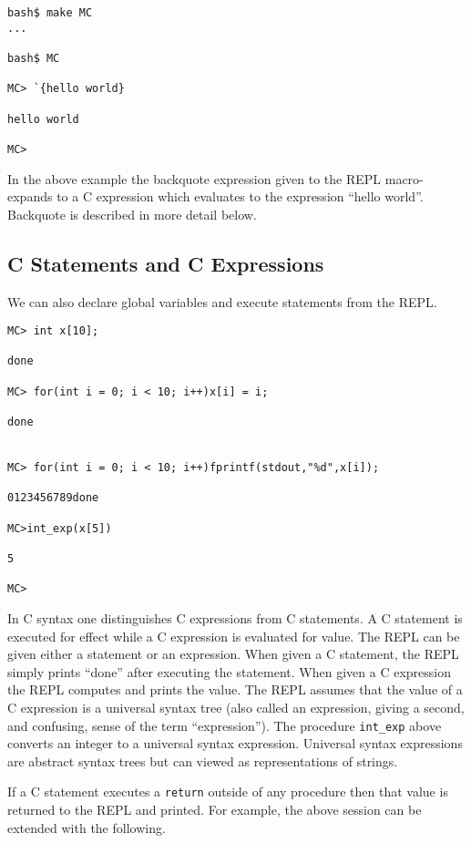 \documentclass{article}
\begin{document}
\begin{verbatim}
bash$ make MC
...

bash$ MC

MC> `{hello world}

hello world

MC>
\end{verbatim}

In the above example the backquote expression given to the REPL macro-expands to a C expression which evaluates to the expression ``hello world''.
Backquote is described in more detail below.

\subsection{C Statements and C Expressions}

We can also declare global variables and execute statements from the REPL.

\begin{verbatim}
MC> int x[10];

done

MC> for(int i = 0; i < 10; i++)x[i] = i;

done


MC> for(int i = 0; i < 10; i++)fprintf(stdout,"%d",x[i]);

0123456789done

MC>int_exp(x[5])

5

MC>
\end{verbatim}

In C syntax one distinguishes C expressions from C statements.  A C
statement is executed for effect while a C expression is evaluated for
value. The REPL can be given either a statement or an expression.  When
given a C statement, the REPL simply prints ``done'' after executing
the statement.
When given a C expression the REPL computes and prints
the value.  The REPL assumes that the value of a C expression
is a universal syntax tree (also called an expression, giving a second, and confusing,
sense of the term ``expression''). The procedure {\tt int\_exp} above
converts an integer to a universal syntax expression.  Universal syntax expressions are abstract
syntax trees but can viewed as representations of strings.

If a C statement executes a {\tt return} outside of any
procedure then that value is returned to the REPL and printed.
For example, the above session can be extended with the following.
\end{document}

